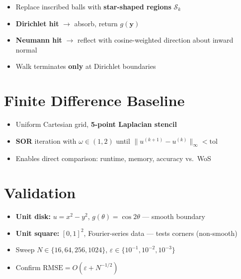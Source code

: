 \documentclass[11pt]{article}
\begin{document}
\begin{itemize}
  \item Replace inscribed balls with \textbf{star-shaped regions} $\mathcal{S}_k$
  \item \textbf{Dirichlet hit} $\to$ absorb, return $g(\mathbf{y})$
  \item \textbf{Neumann hit} $\to$ reflect with cosine-weighted direction about inward normal
  \item Walk terminates \textbf{only} at Dirichlet boundaries
\end{itemize}

\section{Finite Difference Baseline}

\begin{itemize}
  \item Uniform Cartesian grid, \textbf{5-point Laplacian stencil}
  \item \textbf{SOR} iteration with $\omega \in (1, 2)$ until $\|u^{(k+1)} - u^{(k)}\|_\infty < \mathrm{tol}$
  \item Enables direct comparison: runtime, memory, accuracy vs.\ WoS
\end{itemize}

\section{Validation}

\begin{itemize}
  \item \textbf{Unit disk:} $u = x^2 - y^2$, $g(\theta) = \cos 2\theta$ --- smooth boundary
  \item \textbf{Unit square:} $[0,1]^2$, Fourier-series data --- tests corners (non-smooth)
  \item Sweep $N \in \{16, 64, 256, 1024\}$, $\varepsilon \in \{10^{-1}, 10^{-2}, 10^{-3}\}$
  \item Confirm $\mathrm{RMSE} = O(\varepsilon + N^{-1/2})$
\end{itemize}

\end{document}
